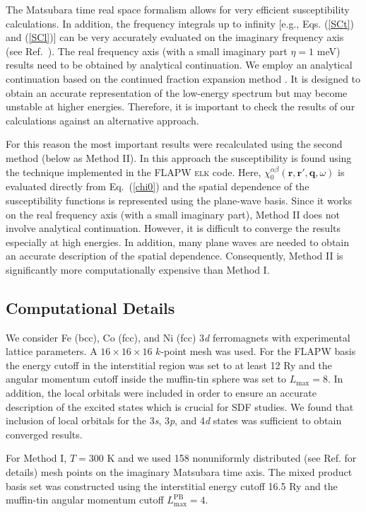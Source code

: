The Matsubara time real space formalism allows for very efficient susceptibility calculations. In addition, the frequency integrals up to infinity [e.g., Eqs. (\ref{SCt}) and (\ref{SCl})] can be very accurately evaluated on the imaginary frequency axis (see Ref.~\citep{Kutepov2}). The real frequency axis (with a small imaginary part $\eta=1$ meV) results need to be obtained by analytical continuation. We employ an analytical continuation based on the continued fraction expansion method \citep{Vidberg}. It is designed to obtain an accurate representation of the low-energy spectrum but may become unstable at higher energies. Therefore, it is important to check the results of our calculations against an alternative approach.

For this reason the most important results were recalculated using the second method (below as Method II). In this approach the susceptibility is found using the technique implemented in the FLAPW \textsc{elk} code.\citep{elk} Here, $\chi_0^{\alpha\beta}(\mathbf{r},\mathbf{r}',\mathbf{q},\omega)$ is evaluated directly from Eq.~(\ref{chi0}) and the spatial dependence of the susceptibility functions is represented using the plane-wave basis. Since it works on the real frequency axis (with a small imaginary part), Method II does not involve analytical continuation. However, it is difficult to converge the results especially at high energies. In addition, many plane waves are needed to obtain an accurate description of the spatial dependence. Consequently, Method II is significantly more computationally expensive than Method I.


\subsection{Computational Details}

We consider Fe (bcc), Co (fcc), and Ni (fcc) 3\emph{d} ferromagnets with experimental lattice parameters. A $16 \times 16 \times 16$ $k$-point mesh was used. For the FLAPW basis the energy cutoff in the interstitial region was set to at least 12 Ry and the angular momentum cutoff inside the muffin-tin sphere was set to $L_{\text{max}}=8$. In addition, the local orbitals were included in order to ensure an accurate description of the excited states which is crucial for SDF studies. We found that inclusion of local orbitals for the 3\emph{s}, 3\emph{p}, and 4\emph{d} states was sufficient to obtain converged results. 

For Method I, $T=300$ K and we used 158 nonuniformly distributed (see Ref. \citep{Kutepov2} for details) mesh points on the imaginary Matsubara time axis. The mixed product basis set was constructed using the interstitial energy cutoff 16.5 Ry and the muffin-tin angular momentum cutoff $L_{\text{max}}^{\text{PB}}=4$. 

